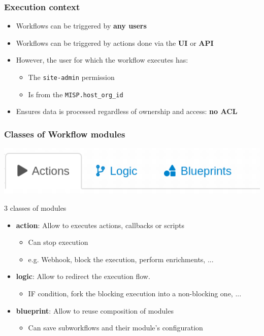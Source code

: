 \begin{frame}
    \frametitle{Execution context}
    \begin{itemize}
        \item Workflows can be triggered by \textbf{any users}
        \item Workflows can be triggered by actions done via the \textbf{UI} or \textbf{API}
        \item However, the user for which the workflow executes has:
        \begin{itemize}
            \item The \texttt{site-admin} permission
            \item Is from the \texttt{MISP.host\_org\_id}
        \end{itemize}
        \item Ensures data is processed regardless of ownership and access: \textbf{no ACL}
    \end{itemize}
\end{frame}

\begin{frame}
    \frametitle{Classes of Workflow modules}
    \begin{center}
        \includegraphics[width=0.6\linewidth]{pictures/module-type.png}
    \end{center}
    3 classes of modules
    \begin{itemize}
        \item \textbf{action}: Allow to executes actions, callbacks or scripts
        \begin{itemize}
            \item Can stop execution
            \item e.g. Webhook, block the execution, perform enrichments, ...
        \end{itemize}
        \item \textbf{logic}: Allow to redirect the execution flow.
        \begin{itemize}
            \item IF condition, fork the blocking execution into a non-blocking one, ...
        \end{itemize}
        \item \textbf{blueprint}: Allow to reuse composition of modules
        \begin{itemize}
            \item Can save subworkflows and their module's configuration
        \end{itemize}
    \end{itemize}
\end{frame}


